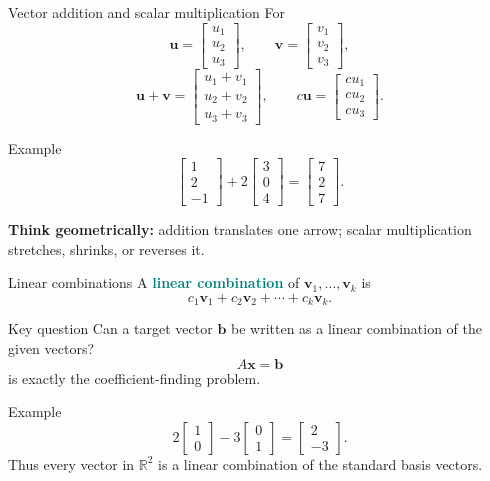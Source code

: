 \documentclass[aspectratio=169,11pt]{beamer}
\newcommand{\R}{\mathbb{R}}
\newcommand{\vect}[1]{\bm{#1}}
\newcommand{\important}[1]{\textcolor{teal}{\textbf{#1}}}
\begin{document}
\begin{frame}{Vector addition and scalar multiplication}
For
\[
\vect u=\begin{bmatrix}u_1\\u_2\\u_3\end{bmatrix},\qquad
\vect v=\begin{bmatrix}v_1\\v_2\\v_3\end{bmatrix},
\]
\[
\vect u+\vect v=
\begin{bmatrix}
u_1+v_1\\u_2+v_2\\u_3+v_3
\end{bmatrix},
\qquad
c\vect u=
\begin{bmatrix}
cu_1\\cu_2\\cu_3
\end{bmatrix}.
\]
\begin{exampleblock}{Example}
\[
\begin{bmatrix}1\\2\\-1\end{bmatrix}
+2\begin{bmatrix}3\\0\\4\end{bmatrix}
=
\begin{bmatrix}7\\2\\7\end{bmatrix}.
\]
\end{exampleblock}
\begin{center}
\textbf{Think geometrically:} addition translates one arrow; scalar multiplication stretches, shrinks, or reverses it.
\end{center}
\end{frame}

\begin{frame}{Linear combinations}
A \important{linear combination} of $\vect v_1,\ldots,\vect v_k$ is
\[
c_1\vect v_1+c_2\vect v_2+\cdots+c_k\vect v_k.
\]
\begin{block}{Key question}
Can a target vector $\vect b$ be written as a linear combination of the given vectors?
\[
A\vect x=\vect b
\]
is exactly the coefficient-finding problem.
\end{block}
\begin{exampleblock}{Example}
\[
2\begin{bmatrix}1\\0\end{bmatrix}
-3\begin{bmatrix}0\\1\end{bmatrix}
=
\begin{bmatrix}2\\-3\end{bmatrix}.
\]
Thus every vector in $\R^2$ is a linear combination of the standard basis vectors.
\end{exampleblock}
\end{frame}
\end{document}
